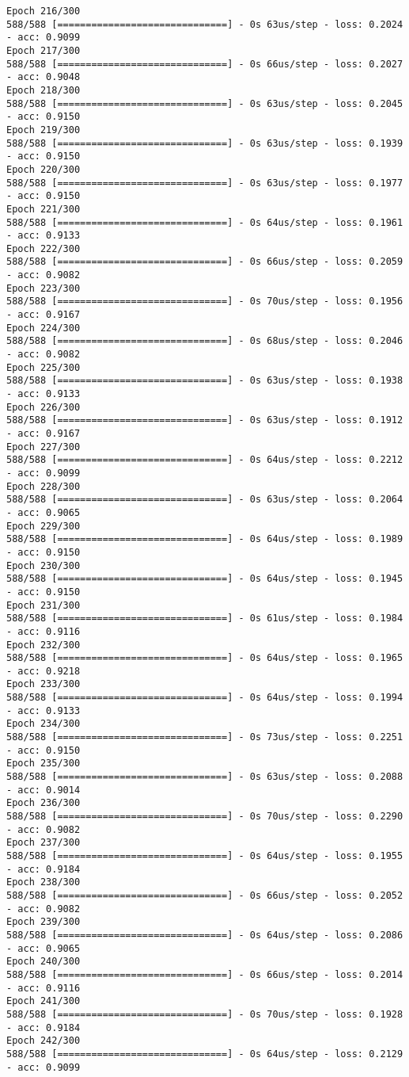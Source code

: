 \documentclass[11pt]{article}
\begin{document}
\begin{Verbatim}[commandchars=\\\{\}]
Epoch 216/300
588/588 [==============================] - 0s 63us/step - loss: 0.2024 - acc: 0.9099
Epoch 217/300
588/588 [==============================] - 0s 66us/step - loss: 0.2027 - acc: 0.9048
Epoch 218/300
588/588 [==============================] - 0s 63us/step - loss: 0.2045 - acc: 0.9150
Epoch 219/300
588/588 [==============================] - 0s 63us/step - loss: 0.1939 - acc: 0.9150
Epoch 220/300
588/588 [==============================] - 0s 63us/step - loss: 0.1977 - acc: 0.9150
Epoch 221/300
588/588 [==============================] - 0s 64us/step - loss: 0.1961 - acc: 0.9133
Epoch 222/300
588/588 [==============================] - 0s 66us/step - loss: 0.2059 - acc: 0.9082
Epoch 223/300
588/588 [==============================] - 0s 70us/step - loss: 0.1956 - acc: 0.9167
Epoch 224/300
588/588 [==============================] - 0s 68us/step - loss: 0.2046 - acc: 0.9082
Epoch 225/300
588/588 [==============================] - 0s 63us/step - loss: 0.1938 - acc: 0.9133
Epoch 226/300
588/588 [==============================] - 0s 63us/step - loss: 0.1912 - acc: 0.9167
Epoch 227/300
588/588 [==============================] - 0s 64us/step - loss: 0.2212 - acc: 0.9099
Epoch 228/300
588/588 [==============================] - 0s 63us/step - loss: 0.2064 - acc: 0.9065
Epoch 229/300
588/588 [==============================] - 0s 64us/step - loss: 0.1989 - acc: 0.9150
Epoch 230/300
588/588 [==============================] - 0s 64us/step - loss: 0.1945 - acc: 0.9150
Epoch 231/300
588/588 [==============================] - 0s 61us/step - loss: 0.1984 - acc: 0.9116
Epoch 232/300
588/588 [==============================] - 0s 64us/step - loss: 0.1965 - acc: 0.9218
Epoch 233/300
588/588 [==============================] - 0s 64us/step - loss: 0.1994 - acc: 0.9133
Epoch 234/300
588/588 [==============================] - 0s 73us/step - loss: 0.2251 - acc: 0.9150
Epoch 235/300
588/588 [==============================] - 0s 63us/step - loss: 0.2088 - acc: 0.9014
Epoch 236/300
588/588 [==============================] - 0s 70us/step - loss: 0.2290 - acc: 0.9082
Epoch 237/300
588/588 [==============================] - 0s 64us/step - loss: 0.1955 - acc: 0.9184
Epoch 238/300
588/588 [==============================] - 0s 66us/step - loss: 0.2052 - acc: 0.9082
Epoch 239/300
588/588 [==============================] - 0s 64us/step - loss: 0.2086 - acc: 0.9065
Epoch 240/300
588/588 [==============================] - 0s 66us/step - loss: 0.2014 - acc: 0.9116
Epoch 241/300
588/588 [==============================] - 0s 70us/step - loss: 0.1928 - acc: 0.9184
Epoch 242/300
588/588 [==============================] - 0s 64us/step - loss: 0.2129 - acc: 0.9099

\end{Verbatim}
\end{document}
